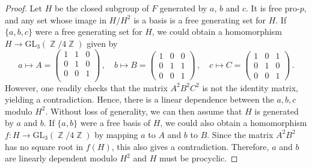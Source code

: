 \documentclass[10pt,a4paper]{amsart}
\DeclareMathOperator{\bbz}{\mathbb{Z}}
\begin{document}
\begin{proof} Let \(H\) be the closed subgroup of \(F\) generated by \(a\), \(b\) and \(c\). It is free pro-\(p\), and any set whose image in \(H/H^2\) is a basis is a free generating set for \(H\). If \(\{a,b,c\}\) were a free generating set for \(H\), we could obtain a homomorphism \(H \to \mathrm{GL}_3(\bbz/4\bbz)\) given by \[a \mapsto A = \begin{pmatrix}
    1 & 1 & 0\\
    0 & 1 & 0\\
    0 & 0 & 1\\
\end{pmatrix}\,,\quad b \mapsto B = \begin{pmatrix}
    1 & 0 & 0\\0 & 1 & 1\\
    0 & 0 & 1
\end{pmatrix}\,,\quad c \mapsto C = \begin{pmatrix}
    1 & 0 & 1\\0 & 1  & 0\\0 & 0 & 1
\end{pmatrix}\,.\] However, one readily checks that the matrix \(A^2B^2C^2\) is not the identity matrix, yielding a contradiction. Hence, there is a linear dependence between the \(a,b,c\) modulo \(H^2\). Without loss of generality, we can then assume that \(H\) is generated by \(a\) and \(b\). If \(\{a,b\}\) were a free basis of \(H\), we could also obtain a homomorphism \(f\colon H \to \mathrm{GL}_3(\bbz/4\bbz)\) by mapping \(a\) to \(A\) and \(b\) to \(B\). Since the matrix \(A^2B^2\) has no square root in \(f(H)\), this also gives a contradiction. Therefore, \(a\) and \(b\) are linearly dependent modulo \(H^2\) and \(H\) must be procyclic.
\end{proof}
\end{document}
